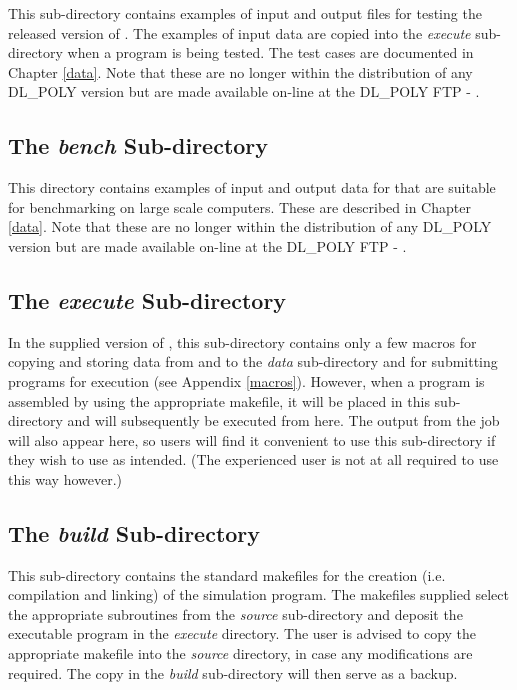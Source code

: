 This sub-directory contains examples of input and output files for
testing the released version of \D.  The examples of input data
are copied into the {\em execute} sub-directory when a program is
being tested.  The test cases are documented in Chapter \ref{data}.
Note that these are no longer within the distribution of any
DL\_POLY version but are made available on-line at the DL\_POLY FTP
- \FTP{}.

\subsection{The {\em bench} Sub-directory}

This directory contains examples of input and output data for \D
that are suitable for benchmarking \D on large scale computers.
These are described in Chapter \ref{data}. Note that these are no
longer within the distribution of any DL\_POLY version but
are made available on-line at the DL\_POLY FTP - \FTP{}.

\subsection{The {\em execute} Sub-directory}

In the supplied version of \D, this sub-directory contains only a
few macros for copying and storing data from and to the {\em data}
sub-directory and for submitting programs for execution (see
Appendix \ref{macros}).  However, when a \D program is assembled
by using the appropriate makefile, it will be placed in this
sub-directory and will subsequently be executed from here.
The output from the job will also appear here, so users will
find it convenient to use this sub-directory if they wish to
use \D as intended.  (The experienced user is not at all
required to use \D this way however.)

\subsection{The {\em build} Sub-directory}

This sub-directory contains the standard makefiles for the
creation (i.e. compilation and linking) of the \D simulation
program.  The makefiles supplied select the appropriate
subroutines from the {\em source} sub-directory and deposit the
executable program in the {\em execute} directory.  The user is
advised to copy the appropriate makefile into the {\em source}
directory, in case any modifications are required.  The copy in
the {\em build} sub-directory will then serve as a backup.

